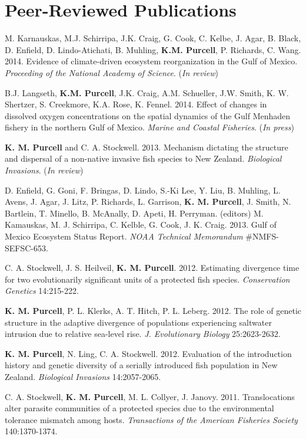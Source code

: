 \documentclass[letterpaper]{article}
\renewenvironment{itemize}{
  \begin{list}{}{
    \setlength{\leftmargin}{1em}
  }
}{
  \end{list}
}
\begin{document}
\section*{Peer-Reviewed Publications}
	\begin{itemize}
    \item M. Karnauskas, M.J. Schirripa, J.K. Craig, G. Cook, C. Kelbe, J. Agar, B. Black, D. Enfield, D. Lindo-Atichati, B. Muhling, \textbf{K.M. Purcell}, P. Richards, C. Wang.  2014. Evidence of climate-driven ecosystem reorganization in the Gulf of Mexico.  \textit{Proceeding of the National Academy of Science}. (\textit{In review})
		\item B.J. Langseth, \textbf{K.M. Purcell}, J.K. Craig, A.M. Schueller, J.W. Smith, K. W. Shertzer, S. Creekmore, K.A. Rose, K. Fennel. 2014. Effect of changes in dissolved oxygen concentrations on the spatial dynamics of the Gulf Menhaden fishery in the northern Gulf of Mexico. \textit{Marine and Coastal Fisheries}. (\textit{In press})
		\item \textbf{K. M. Purcell} and C. A. Stockwell. 2013. Mechanism dictating the structure and dispersal of a non-native invasive fish species to New Zealand. \textit{Biological Invasions}. (\textit{In review})
		\item D. Enfield, G. Goni, F. Bringas, D. Lindo, S.-Ki Lee, Y. Liu, B. Muhling, L. Avens, J. Agar, J. Litz, P. Richards, L. Garrison, \textbf{K. M. Purcell}, J. Smith, N. Bartlein, T. Minello, B. McAnally, D. Apeti, H. Perryman. (editors) M. Kamauskas, M. J. Schirripa, C. Kelble, G. Cook, J. K. Craig. 2013. Gulf of Mexico Ecosystem Status Report. \textit{NOAA Technical Memorandum} #NMFS-SEFSC-653.
		\item C. A. Stockwell, J. S. Heilveil, \textbf{K. M. Purcell}. 2012. Estimating divergence time for two evolutionarily significant units of a protected fish species. \textit{Conservation Genetics} 14:215-222.
		\item \textbf{K. M. Purcell}, P. L. Klerks, A. T. Hitch, P. L. Leberg. 2012. The role of genetic structure in the adaptive divergence of populations experiencing saltwater intrusion due to relative sea-level rise. \textit{J. Evolutionary Biology} 25:2623-2632.
		\item \textbf{K. M. Purcell}, N. Ling, C. A. Stockwell. 2012. Evaluation of the introduction history and genetic diversity of a serially introduced fish population in New Zealand. \textit{Biological Invasions} 14:2057-2065.
		\item C. A. Stockwell, \textbf{K. M. Purcell}, M. L. Collyer, J. Janovy. 2011. Translocations alter parasite communities of a protected species due to the environmental tolerance mismatch among hosts. \textit{Transactions of the American Fisheries Society} 140:1370-1374.

\end{itemize}
\end{document}
